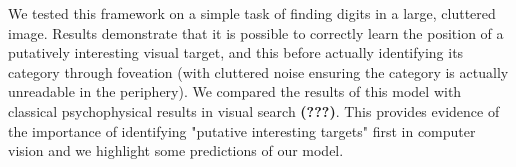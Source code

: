 We tested this framework on a simple task of finding digits in a large, cluttered image. Results demonstrate that it is possible to correctly learn the position of a putatively interesting visual target, and this before actually identifying its category through foveation (with cluttered noise ensuring the category is actually unreadable in the periphery). We compared the results of this model with classical psychophysical results in visual search {\bf (???)}. This provides evidence of the importance of identifying "putative interesting targets" first in computer vision and we highlight some predictions of our model.
\fi
